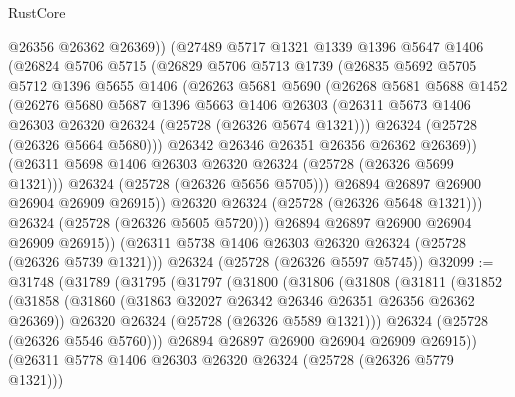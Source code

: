 \begin{lexlean}{RustCore}
\begin{coremodule}
              @26356
              @26362
              @26369))
          (@27489
            @5717
            @1321
            @1339
            @1396
            @5647
            @1406
            (@26824
              @5706
              @5715
              (@26829
                @5706
                @5713
                @1739
                (@26835
                  @5692
                  @5705
                  @5712
                  @1396
                  @5655
                  @1406
                  (@26263
                    @5681
                    @5690
                    (@26268
                      @5681
                      @5688
                      @1452
                      (@26276
                        @5680
                        @5687
                        @1396
                        @5663
                        @1406
                        @26303
                        (@26311 @5673 @1406 @26303 @26320 @26324 (@25728 (@26326 @5674 @1321)))
                        @26324
                        (@25728 (@26326 @5664 @5680)))
                      @26342
                      @26346
                      @26351
                      @26356
                      @26362
                      @26369))
                  (@26311 @5698 @1406 @26303 @26320 @26324 (@25728 (@26326 @5699 @1321)))
                  @26324
                  (@25728 (@26326 @5656 @5705)))
                @26894
                @26897
                @26900
                @26904
                @26909
                @26915))
            @26320
            @26324
            (@25728 (@26326 @5648 @1321)))
          @26324
          (@25728 (@26326 @5605 @5720)))
        @26894
        @26897
        @26900
        @26904
        @26909
        @26915))
    (@26311 @5738 @1406 @26303 @26320 @26324 (@25728 (@26326 @5739 @1321)))
    @26324
    (@25728 (@26326 @5597 @5745))
@32099 := @31748
    (@31789
      (@31795
        (@31797
          (@31800
            (@31806
              (@31808
                (@31811
                  (@31852
                    (@31858
                      (@31860 (@31863 @32027 @26342 @26346 @26351 @26356 @26362 @26369))
                      @26320
                      @26324
                      (@25728 (@26326 @5589 @1321)))
                    @26324
                    (@25728 (@26326 @5546 @5760)))
                  @26894
                  @26897
                  @26900
                  @26904
                  @26909
                  @26915))
              (@26311 @5778 @1406 @26303 @26320 @26324 (@25728 (@26326 @5779 @1321)))

\end{coremodule}
\end{lexlean}
